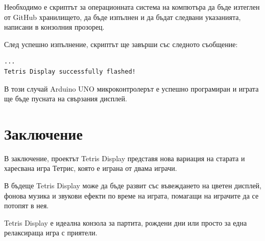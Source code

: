 \documentclass[titlepage, oneside, 14pt]{extbook}
\newcommand{\ard}{Arduino\texttrademark{}}
\begin{document}
Необходимо е скриптът за операционната система на компютъра да бъде изтеглен от GitHub хранилището,
да бъде изпълнен и да бъдат следвани указанията, написани в конзолния прозорец.

След успешно изпълнение, скриптът ще завърши със следното съобщение:

\begin{verbatim}
...
Tetris Display successfully flashed!
\end{verbatim}

В този случай \ard{} UNO микроконтролерът е успешно програмиран и играта ще бъде пусната на свързания дисплей.

\chapter*{Заключение}

В заключение, проектът Tetris Display представя нова вариация на старата и харесвана игра Тетрис,
която е играна от двама играчи.

В бъдеще Tetris Display може да бъде развит със въвеждането на цветен дисплей, фонова музика и звукови ефекти
по време на играта, помагащи на играчите да се потопят в нея.

\textmd{Tetris Display} е идеална конзола за партита, рождени дни или просто за една релаксираща
игра с приятели.

\printbibliography[heading=bibliography,title={Използвана литература}]

\tableofcontents

\end{document}
